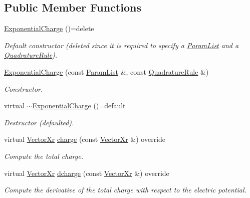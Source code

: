 \subsection*{Public Member Functions}
\begin{DoxyCompactItemize}
\item 
\hypertarget{classExponentialCharge_aa231654787ef3e6f60f0df672de44f0d}{\hyperlink{classExponentialCharge_aa231654787ef3e6f60f0df672de44f0d}{Exponential\-Charge} ()=delete}\label{classExponentialCharge_aa231654787ef3e6f60f0df672de44f0d}

\begin{DoxyCompactList}\small\item\em Default constructor (deleted since it is required to specify a \hyperlink{classParamList}{Param\-List} and a \hyperlink{classQuadratureRule}{Quadrature\-Rule}). \end{DoxyCompactList}\item 
\hyperlink{classExponentialCharge_ad643c7a5be928315affe78e164387bd0}{Exponential\-Charge} (const \hyperlink{classParamList}{Param\-List} \&, const \hyperlink{classQuadratureRule}{Quadrature\-Rule} \&)
\begin{DoxyCompactList}\small\item\em Constructor. \end{DoxyCompactList}\item 
\hypertarget{classExponentialCharge_a4440f979418ee3b20fb2e366933c6aff}{virtual \hyperlink{classExponentialCharge_a4440f979418ee3b20fb2e366933c6aff}{$\sim$\-Exponential\-Charge} ()=default}\label{classExponentialCharge_a4440f979418ee3b20fb2e366933c6aff}

\begin{DoxyCompactList}\small\item\em Destructor (defaulted). \end{DoxyCompactList}\item 
virtual \hyperlink{typedefs_8h_aae6cee78ed9cd8f234ed8cb48682548a}{Vector\-Xr} \hyperlink{classExponentialCharge_a97ff25e546dee1ee5fec866b290ec999}{charge} (const \hyperlink{typedefs_8h_aae6cee78ed9cd8f234ed8cb48682548a}{Vector\-Xr} \&) override
\begin{DoxyCompactList}\small\item\em Compute the total charge. \end{DoxyCompactList}\item 
virtual \hyperlink{typedefs_8h_aae6cee78ed9cd8f234ed8cb48682548a}{Vector\-Xr} \hyperlink{classExponentialCharge_a06f7a60ee2bce4590e2a12286aa0e9eb}{dcharge} (const \hyperlink{typedefs_8h_aae6cee78ed9cd8f234ed8cb48682548a}{Vector\-Xr} \&) override
\begin{DoxyCompactList}\small\item\em Compute the derivative of the total charge with respect to the electric potential. \end{DoxyCompactList}\end{DoxyCompactItemize}
